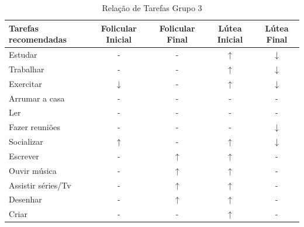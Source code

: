         \begin{table}[ht]
            \centering
            \caption{Relação de Tarefas Grupo 3}
            \label{tab13}
            \begin{tabular}{lcccc}
            \toprule
            Tarefas recomendadas  & Folicular Inicial & Folicular Final  & Lútea Inicial& Lútea Final \\ 
            \midrule
            Estudar & -  & - & $\uparrow$ & $\downarrow$ \\ 
            \midrule
            Trabalhar & - & -  & $\uparrow$ &  $\downarrow$  \\ 
            \midrule
            Exercitar & $\downarrow$ & -& $\uparrow$ &  $\downarrow$  \\ 
            \midrule
            Arrumar a casa  & - & -  & - & - \\ 
            \midrule
            Ler & - & -  & - & - \\ 
            \midrule
            Fazer reuniões & - & - & -& $\downarrow$ \\ 
            \midrule
            Socializar & $\uparrow$ & -  & $\uparrow$ & $\downarrow$ \\ 
            \midrule
            Escrever & - & $\uparrow$  & $\uparrow$ & - \\ 
            \midrule
            Ouvir música & - & $\uparrow$  & $\uparrow$  & -\\ 
            \midrule
            Assistir séries/Tv & - &  $\uparrow$ &  $\uparrow$ & - \\ 
            \midrule
            Desenhar & -  & $\uparrow$  & $\uparrow$ & - \\ 
            \midrule
            Criar & - &  -  &  $\uparrow$ & - \\ 
            \bottomrule    
            \end{tabular}
            \end{table}

